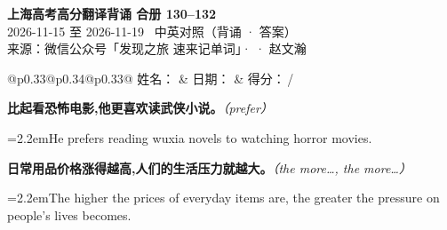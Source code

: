 \documentclass[11pt,a4paper]{article}
\newcommand{\num}[1]{\makebox[1.9em][r]{#1.}\hspace{0.3em}}
\newcommand{\prompt}[1]{\emph{\textcolor{tipblue}{\small（#1）}}}
\begin{document}
\pagestyle{plain}
\begin{center}
{\LARGE\bfseries 上海高考高分翻译背诵 \quad 合册 130–132}\\[0.25em]
{\large 2026-11-15 至 2026-11-19 \quad\ 中英对照（背诵 · 答案）}\\[0.35em]
{\footnotesize 来源：微信公众号「发现之旅 速来记单词」·  · 赵文瀚}
\end{center}

\vspace{0.4em}
\noindent\begin{tabular}{@{}p{0.33\textwidth}@{}p{0.34\textwidth}@{}p{0.33\textwidth}@{}}
姓名：\underline{\hspace{2.0cm}} & 日期：\underline{\hspace{2.0cm}} & 得分：\underline{\hspace{1.4cm}}\,/ \\
\end{tabular}

\vspace{0.5em}

\vspace{0.8em}
\vspace{0.35em}\vspace{0.15em}

\begin{minipage}{\linewidth}

\num{1}\textbf{比起看恐怖电影,他更喜欢读武侠小说。}\prompt{prefer}

\vspace{0.15em}

\noindent\hangindent=2.2em\hspace{2.2em}He prefers reading wuxia novels to watching horror movies.

\end{minipage}

\begin{minipage}{\linewidth}

\num{2}\textbf{日常用品价格涨得越高,人们的生活压力就越大。}\prompt{the more…, the more…}

\vspace{0.15em}

\noindent\hangindent=2.2em\hspace{2.2em}The higher the prices of everyday items are, the greater the pressure on people’s lives becomes.

\end{minipage}
\end{document}
